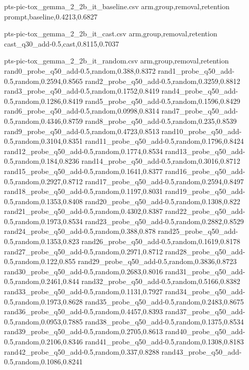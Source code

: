 \begin{filecontents*}[overwrite]{pts-pic-tox_gemma_2_2b_it_baseline.csv}
arm,group,removal,retention
prompt,baseline,0.4213,0.6827
\end{filecontents*}
\begin{filecontents*}[overwrite]{pts-pic-tox_gemma_2_2b_it_cast.csv}
arm,group,removal,retention
cast_q30_add-0.5,cast,0.8115,0.7037
\end{filecontents*}
\begin{filecontents*}[overwrite]{pts-pic-tox_gemma_2_2b_it_random.csv}
arm,group,removal,retention
rand0_probe_q50_add-0.5,random,0.388,0.8372
rand1_probe_q50_add-0.5,random,0.2594,0.8565
rand2_probe_q50_add-0.5,random,0.3259,0.8812
rand3_probe_q50_add-0.5,random,0.1752,0.8419
rand4_probe_q50_add-0.5,random,0.1286,0.8419
rand5_probe_q50_add-0.5,random,0.1596,0.8429
rand6_probe_q50_add-0.5,random,0.0998,0.8314
rand7_probe_q50_add-0.5,random,0.4346,0.8759
rand8_probe_q50_add-0.5,random,0.235,0.8539
rand9_probe_q50_add-0.5,random,0.4723,0.8513
rand10_probe_q50_add-0.5,random,0.3104,0.8351
rand11_probe_q50_add-0.5,random,0.1796,0.8424
rand12_probe_q50_add-0.5,random,0.1774,0.8534
rand13_probe_q50_add-0.5,random,0.184,0.8236
rand14_probe_q50_add-0.5,random,0.3016,0.8712
rand15_probe_q50_add-0.5,random,0.1641,0.8377
rand16_probe_q50_add-0.5,random,0.2927,0.8712
rand17_probe_q50_add-0.5,random,0.2594,0.8497
rand18_probe_q50_add-0.5,random,0.1197,0.8031
rand19_probe_q50_add-0.5,random,0.1353,0.8408
rand20_probe_q50_add-0.5,random,0.1308,0.822
rand21_probe_q50_add-0.5,random,0.4302,0.8387
rand22_probe_q50_add-0.5,random,0.1973,0.8534
rand23_probe_q50_add-0.5,random,0.2882,0.8529
rand24_probe_q50_add-0.5,random,0.388,0.878
rand25_probe_q50_add-0.5,random,0.1353,0.823
rand26_probe_q50_add-0.5,random,0.1619,0.8178
rand27_probe_q50_add-0.5,random,0.2971,0.8712
rand28_probe_q50_add-0.5,random,0.122,0.855
rand29_probe_q50_add-0.5,random,0.3836,0.8723
rand30_probe_q50_add-0.5,random,0.2683,0.8016
rand31_probe_q50_add-0.5,random,0.2461,0.844
rand32_probe_q50_add-0.5,random,0.5166,0.8382
rand33_probe_q50_add-0.5,random,0.1131,0.7927
rand34_probe_q50_add-0.5,random,0.1973,0.8628
rand35_probe_q50_add-0.5,random,0.2483,0.8675
rand36_probe_q50_add-0.5,random,0.4457,0.8393
rand37_probe_q50_add-0.5,random,0.0953,0.7885
rand38_probe_q50_add-0.5,random,0.1375,0.8534
rand39_probe_q50_add-0.5,random,0.2705,0.8613
rand40_probe_q50_add-0.5,random,0.2106,0.8346
rand41_probe_q50_add-0.5,random,0.1308,0.8183
rand42_probe_q50_add-0.5,random,0.337,0.8288
rand43_probe_q50_add-0.5,random,0.1086,0.8241

\end{filecontents*}
